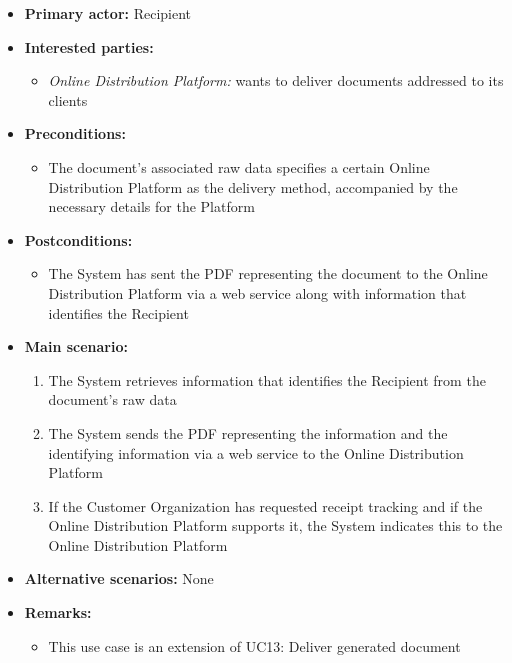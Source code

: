 \documentclass[a4paper,10pt]{article}
\begin{document}
\begin{itemize}
    \item \textbf{Primary actor:} Recipient
    \item \textbf{Interested parties:} 
        \begin{itemize}
            \item \textit{Online Distribution Platform:} wants to deliver documents addressed to its clients
        \end{itemize}

    \item \textbf{Preconditions:}
        \begin{itemize}
            \item The document's associated raw data specifies a certain Online Distribution Platform as the delivery method, accompanied by the necessary details for the Platform
        \end{itemize}

    \item \textbf{Postconditions:}
        \begin{itemize}
            \item The System has sent the PDF representing the document to the Online Distribution Platform via a web service along with information that identifies the Recipient
        \end{itemize}
        
    \item \textbf{Main scenario:} 
    \begin{enumerate}
       \item The System retrieves information that identifies the Recipient from the document's raw data
       \item The System sends the PDF representing the information and the identifying information via a web service to the Online Distribution Platform
       \item If the Customer Organization has requested receipt tracking and if the Online Distribution Platform supports it, the System indicates this to the Online Distribution Platform
    \end{enumerate}

    \item \textbf{Alternative scenarios:} 
    None
    
    \item \textbf{Remarks:}
        \begin{itemize}
          \item This use case is an extension of UC13: Deliver generated document
        \end{itemize}
\end{itemize}
\end{document}
